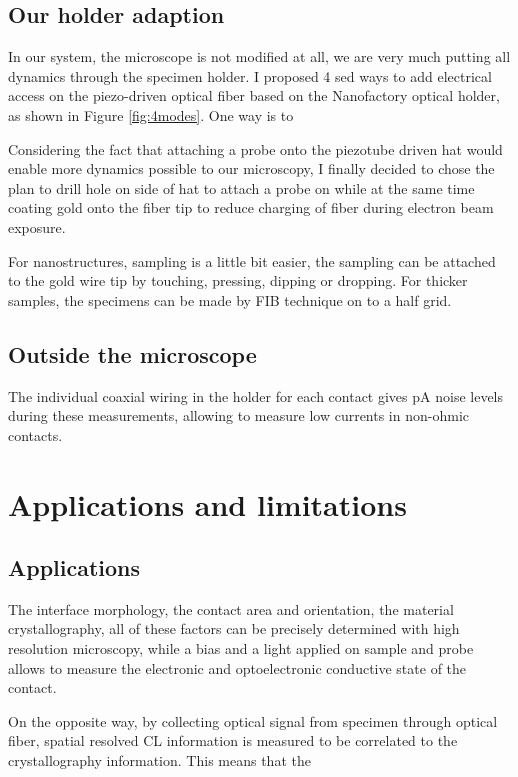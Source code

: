 \subsection{Our holder adaption}
In our system, the microscope is not modified at all, we are very much putting all dynamics through the specimen holder. I proposed 4 sed ways to add electrical access on the piezo-driven optical fiber based on the Nanofactory optical holder, as shown in Figure \ref{fig:4modes}. One way is to 

Considering the fact that attaching a probe onto the piezotube driven hat would enable more dynamics possible to our microscopy, I finally decided to chose the plan to drill hole on side of hat to attach a probe on while at the same time coating gold onto the fiber tip to reduce charging of fiber during electron beam exposure. 

For nanostructures, sampling is a little bit easier, the sampling can be attached to the gold wire tip by touching, pressing, dipping or dropping. For thicker samples, the specimens can be made by FIB technique on to a half grid. 


\subsection{Outside the microscope}
The individual coaxial wiring in the holder for each contact gives pA noise levels during these measurements, allowing to measure low currents in non-ohmic contacts.


\section{Applications and limitations}
\subsection{Applications}
 The interface morphology, the contact area and orientation, the material crystallography, all of these factors can be precisely determined with high resolution microscopy, while a bias and a light applied on sample and probe allows to measure the electronic and optoelectronic conductive state of the contact. 
 
On the opposite way, by collecting optical signal from specimen through optical fiber, spatial resolved CL information is measured to be correlated to the crystallography information. 
This means that the 

